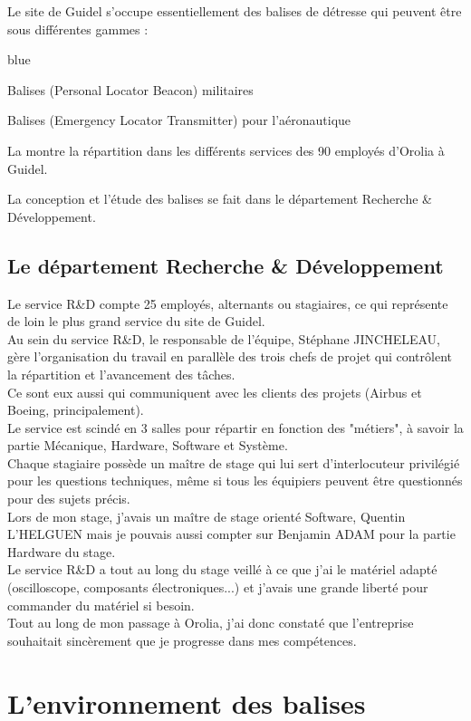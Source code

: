 Le site de Guidel s'occupe essentiellement des balises de détresse qui peuvent être sous différentes gammes :

\begin{items}{blue}{\Circle}
    \item Balises  (Personal Locator Beacon) militaires
    \item Balises  (Emergency Locator Transmitter) pour l’aéronautique 
\end{items}




La  montre la répartition dans les différents services des 90 employés d'Orolia à Guidel.


La conception et l'étude des balises se fait dans le département Recherche \& Développement. 
\newline
\section{Le département Recherche \& Développement}

Le service R\&D compte 25 employés, alternants ou stagiaires, ce qui représente de loin le plus grand service du site de Guidel.\\

Au sein du service R\&D, le responsable de l’équipe, Stéphane JINCHELEAU, gère l’organisation du travail en parallèle des trois chefs de projet qui contrôlent la répartition et l’avancement des tâches. \\
Ce sont eux aussi qui communiquent avec les clients des projets (Airbus et Boeing, principalement).\\ 
Le service est scindé en 3 salles pour répartir en fonction des "métiers", à savoir la partie Mécanique, Hardware, Software et Système.\\
Chaque stagiaire possède un maître de stage qui lui sert d’interlocuteur privilégié pour les questions techniques, même si tous les équipiers peuvent être questionnés pour des sujets précis.\\ 

Lors de mon stage, j'avais un maître de stage orienté Software, Quentin L'HELGUEN mais je pouvais aussi compter sur Benjamin ADAM pour la partie Hardware du stage.\\
Le service R\&D a tout au long du stage veillé à ce que j'ai le matériel adapté (oscilloscope, composants électroniques...) et j'avais une grande liberté pour commander du matériel si besoin.\\
Tout au long de mon passage à Orolia, j'ai donc constaté que l'entreprise souhaitait sincèrement que je progresse dans mes compétences.\chapter{L'environnement des balises}  


